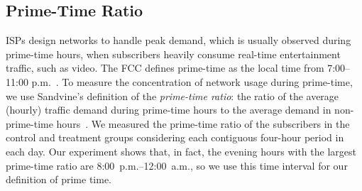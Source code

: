 \subsection{Prime-Time Ratio} \label{subsec:primetime}

ISPs design networks to handle peak demand, which is usually observed
during prime-time hours, when subscribers heavily consume real-time
entertainment traffic, such as video.  The FCC defines prime-time as the
local time from 7:00--11:00 p.m.~\cite{fcc2014measuring-broadband}. To
measure the concentration of network usage during prime-time, we use
Sandvine's definition of the \emph{prime-time ratio}: the ratio of the
average (hourly) traffic demand during prime-time hours to the average
demand in non-prime-time hours~\cite{sandvine20141h, sandvine20142h}.
We measured the prime-time ratio of the subscribers in the control and
treatment groups considering each contiguous four-hour period in each
day. Our experiment shows that, in fact, the evening hours with the
largest prime-time ratio are 8:00~p.m.--12:00~a.m., so we use this time
interval for our definition of prime time.




